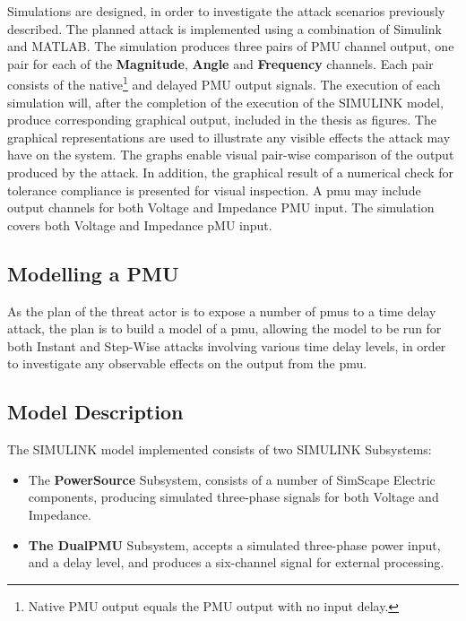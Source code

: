 Simulations are designed, in order to investigate the attack scenarios previously described. The planned attack is implemented using a combination of Simulink and MATLAB. The simulation produces three pairs of PMU channel output, one pair for each of the \textbf{Magnitude}, \textbf{Angle} and \textbf{Frequency} channels.
Each pair consists of the native\footnote{Native PMU output equals the PMU output with no input delay.} and delayed  PMU output signals. 
The execution of each simulation will, after the completion of the execution of the SIMULINK model, produce corresponding graphical output, included in the thesis as figures. The graphical representations are used to illustrate any visible effects the attack may have on the system. The graphs enable visual pair-wise comparison of the output produced by the attack. In addition, the graphical result of a numerical check for tolerance compliance is presented for visual inspection.
A \acrshort{pmu} may include output channels for both Voltage and Impedance PMU input. The simulation covers both Voltage and Impedance pMU input.

\subsection{Modelling a PMU} \label{subsec:ModelPMU}

As the plan of the threat actor is to expose  a number of \acrshort{pmu}s to a time  delay attack, the plan is to build a model of a \acrshort{pmu}, allowing the model to be run for both Instant and Step-Wise attacks involving various time delay levels, in order to investigate any observable effects on the output from the \acrshort{pmu}.
\subsection{Model Description}
The SIMULINK model implemented consists of two SIMULINK Subsystems:
\begin{itemize}
    \item The \textbf{PowerSource} Subsystem, consists of a number of SimScape Electric components, producing simulated three-phase signals for both  Voltage and Impedance.
    \item \textbf{The DualPMU} Subsystem, accepts a simulated three-phase power input, and a delay level, and produces a six-channel signal for external processing. 
\end{itemize}

